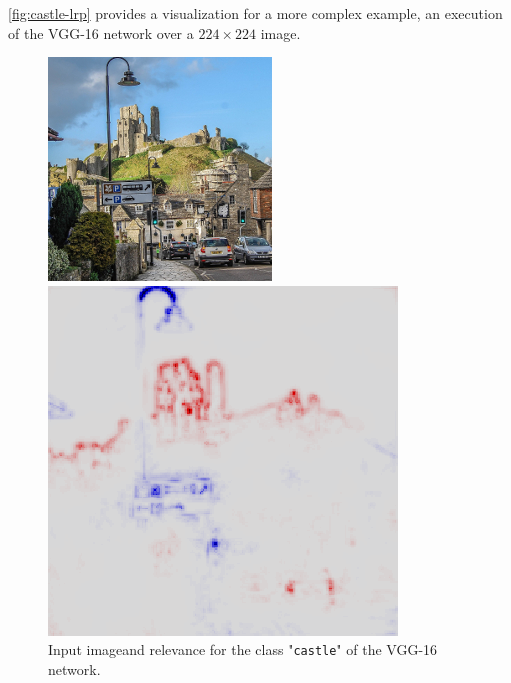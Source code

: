 \documentclass[twocolumn]{../cs-classes/cs-classes}
\newcommand*{\1}{\digitsbb{1}}
\newcommand*{\0}{\digitsbb{0}}
\begin{document}
\autoref{fig:castle-lrp} provides a visualization for a more complex example, an execution of the VGG-16 network over a $224\times224$ image. 
\begin{figure}[H]
    \centering
    \begin{minipage}[c]{.49\linewidth}
        \centering
        \includegraphics[width=\linewidth]{castle.jpg}
    \end{minipage}
    \begin{minipage}[c]{.49\linewidth}
        \centering
        \includegraphics[width=\linewidth]{castle-lrp.png}
    \end{minipage}
    \caption{Input image\protect\footnotemark and relevance for the class "\texttt{castle}" of the VGG-16 network.}
    \label{fig:castle-lrp}
\end{figure}
\end{document}
